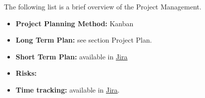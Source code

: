 The following list is a brief overview of the Project Management.

\begin{itemize}
    \item \textbf{Project Planning Method: } Kanban
    \item \textbf{Long Term Plan: } see section Project Plan.
    \item \textbf{Short Term Plan: } available in \href{https://substep.atlassian.net/jira/software/projects/UI/boards/1/backlog}{Jira}
    \item \textbf{Risks: }
    \item \textbf{Time tracking: } available in \href{https://substep.atlassian.net/jira/software/projects/UI/boards/1/backlog}{Jira}.
\end{itemize}
